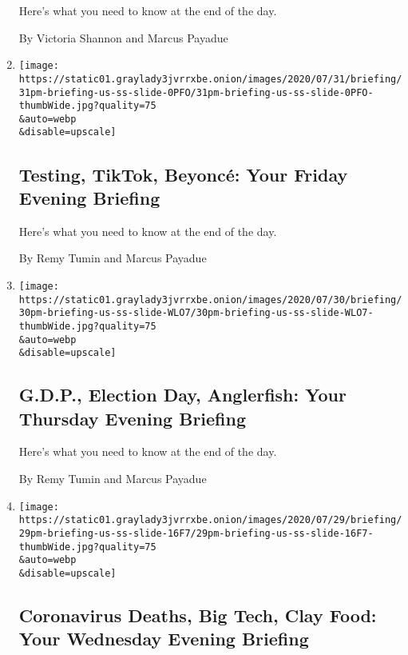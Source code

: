 \begin{enumerate}
  Here's what you need to know at the end of the day.

  By Victoria Shannon and Marcus Payadue
\item
  \href{/2020/07/31/briefing/testing-tiktok-beyonce.html}{}

  \texttt{[image: https://static01.graylady3jvrrxbe.onion/images/2020/07/31/briefing/31pm-briefing-us-ss-slide-0PFO/31pm-briefing-us-ss-slide-0PFO-thumbWide.jpg?quality=75\\\&auto=webp\\\&disable=upscale]}

  \hypertarget{testing-tiktok-beyoncuxe9-your-friday-evening-briefing}{%
  \subsection{Testing, TikTok, Beyoncé: Your Friday Evening
  Briefing}\label{testing-tiktok-beyoncuxe9-your-friday-evening-briefing}}

  Here's what you need to know at the end of the day.

  By Remy Tumin and Marcus Payadue
\item
  \href{/2020/07/30/briefing/gdp-election-day-anglerfish.html}{}

  \texttt{[image: https://static01.graylady3jvrrxbe.onion/images/2020/07/30/briefing/30pm-briefing-us-ss-slide-WLO7/30pm-briefing-us-ss-slide-WLO7-thumbWide.jpg?quality=75\\\&auto=webp\\\&disable=upscale]}

  \hypertarget{gdp-election-day-anglerfish-your-thursday-evening-briefing}{%
  \subsection{G.D.P., Election Day, Anglerfish: Your Thursday Evening
  Briefing}\label{gdp-election-day-anglerfish-your-thursday-evening-briefing}}

  Here's what you need to know at the end of the day.

  By Remy Tumin and Marcus Payadue
\item
  \href{/2020/07/29/briefing/coronavirus-deaths-big-tech-clay-food.html}{}

  \texttt{[image: https://static01.graylady3jvrrxbe.onion/images/2020/07/29/briefing/29pm-briefing-us-ss-slide-16F7/29pm-briefing-us-ss-slide-16F7-thumbWide.jpg?quality=75\\\&auto=webp\\\&disable=upscale]}

  \hypertarget{coronavirus-deaths-big-tech-clay-food-your-wednesday-evening-briefing}{%
  \subsection{Coronavirus Deaths, Big Tech, Clay Food: Your Wednesday
  Evening
  Briefing}\label{coronavirus-deaths-big-tech-clay-food-your-wednesday-evening-briefing}}


\end{enumerate}
